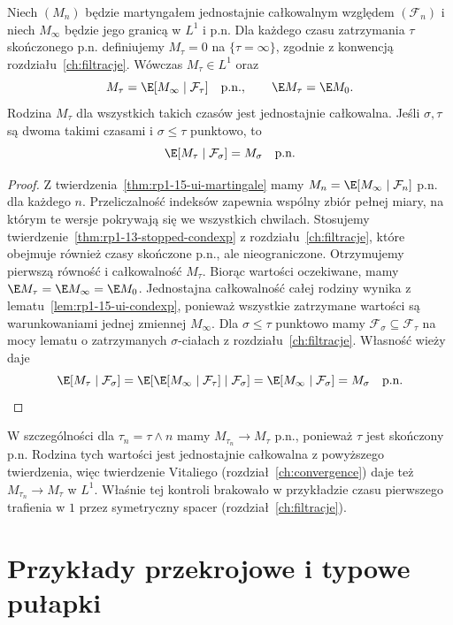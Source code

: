 \begin{twierdzenie}
\label{thm:rp1-15-ui-stopping}
Niech $(M_n)$ będzie martyngałem jednostajnie
całkowalnym względem $(\mathcal F_n)$ i niech
$M_\infty$ będzie jego granicą w $L^1$ i p.n.
Dla każdego czasu zatrzymania $\tau$ skończonego
p.n. definiujemy $M_\tau=0$ na $\{\tau=\infty\}$,
zgodnie z konwencją rozdziału~\ref{ch:filtracje}.
Wówczas $M_\tau\in L^1$ oraz
\[
M_\tau=\E[M_\infty\mid\mathcal F_\tau]\quad\text{p.n.},
\qquad \E M_\tau=\E M_0.
\]
Rodzina $M_\tau$ dla wszystkich takich czasów
jest jednostajnie całkowalna.
Jeśli $\sigma,\tau$ są dwoma takimi czasami
i $\sigma\leq\tau$ punktowo, to
\[
\E[M_\tau\mid\mathcal F_\sigma]=M_\sigma
\quad\text{p.n.}
\]
\end{twierdzenie}
\begin{proof}
Z twierdzenia~\ref{thm:rp1-15-ui-martingale}
mamy $M_n=\E[M_\infty\mid\mathcal F_n]$ p.n.
dla każdego $n$. Przeliczalność indeksów
zapewnia wspólny zbiór pełnej miary, na którym
te wersje pokrywają się we wszystkich chwilach.
Stosujemy twierdzenie~\ref{thm:rp1-13-stopped-condexp}
z rozdziału~\ref{ch:filtracje}, które obejmuje
również czasy skończone p.n., ale nieograniczone.
Otrzymujemy pierwszą równość i całkowalność
$M_\tau$. Biorąc wartości oczekiwane, mamy
$\E M_\tau=\E M_\infty=\E M_0$.
Jednostajna całkowalność całej rodziny wynika
z lematu~\ref{lem:rp1-15-ui-condexp},
ponieważ wszystkie zatrzymane wartości są
warunkowaniami jednej zmiennej $M_\infty$.
Dla $\sigma\leq\tau$ punktowo mamy
$\mathcal F_\sigma\subseteq\mathcal F_\tau$
na mocy lematu o zatrzymanych $\sigma$-ciałach
z rozdziału~\ref{ch:filtracje}.
Własność wieży daje
\[
\E[M_\tau\mid\mathcal F_\sigma]
=\E[\E[M_\infty\mid\mathcal F_\tau]\mid\mathcal F_\sigma]
=\E[M_\infty\mid\mathcal F_\sigma]=M_\sigma
\quad\text{p.n.}
\]
\end{proof}

W szczególności dla $\tau_n=\tau\wedge n$ mamy
$M_{\tau_n}\to M_\tau$ p.n., ponieważ $\tau$
jest skończony p.n. Rodzina tych wartości
jest jednostajnie całkowalna z powyższego
twierdzenia, więc twierdzenie Vitaliego
(rozdział~\ref{ch:convergence}) daje też
$M_{\tau_n}\to M_\tau$ w $L^1$.
Właśnie tej kontroli brakowało w przykładzie
czasu pierwszego trafienia w $1$ przez
symetryczny spacer (rozdział~\ref{ch:filtracje}).

\section{Przykłady przekrojowe i typowe pułapki}


